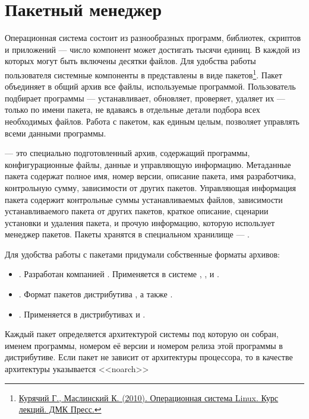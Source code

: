 \chapter{Пакетный менеджер}\label{package-manager}
Операционная система состоит из разнообразных программ, библиотек, скриптов и приложений --- 
число компонент может достигать тысячи единиц. В каждой из которых могут быть включены десятки файлов. 
Для удобства работы пользователя системные компоненты в  представлены в виде 
пакетов\footnote{\href{https://docs.altlinux.org/books/altlibrary-linuxintro2.pdf}{Курячий Г., Маслинский К. (2010). 
Операционная система Linux. Курс лекций. ДМК Пресс.}}. Пакет объединяет в общий архив все файлы, 
используемые программой. Пользователь подбирает программы --- устанавливает, обновляет, проверяет, 
удаляет их --- только по имени пакета, не вдаваясь в отдельные детали подбора всех необходимых файлов. 
Работа с пакетом, как единым целым, позволяет управлять всеми данными программы.

 --- это специально подготовленный архив, содержащий программы, конфигурационные файлы, 
данные и управляющую информацию. Метаданные пакета содержат полное имя, номер версии, описание пакета, 
имя разработчика, контрольную сумму, зависимости от других пакетов. Управляющая информация пакета содержит 
контрольные суммы устанавливаемых файлов, зависимости устанавливаемого пакета от других пакетов, 
краткое описание, сценарии установки и удаления пакета, и прочую информацию, которую использует 
менеджер пакетов. Пакеты хранятся в специальном хранилище --- .

Для удобства работы с пакетами придумали собственные форматы архивов:

\begin{itemize}
	\item {}. Разработан компанией . Применяется в системе , ,  и .
	\item {}. Формат пакетов дистрибутива , а также .
	\item {}. Применяется в дистрибутивах  и .
\end{itemize}

Каждый пакет определяется архитектурой системы под которую он собран, именем программы, 
номером её версии и номером релиза этой программы в дистрибутиве. Если пакет не зависит 
от архитектуры процессора, то в качестве архитектуры указывается <<noarch>>

